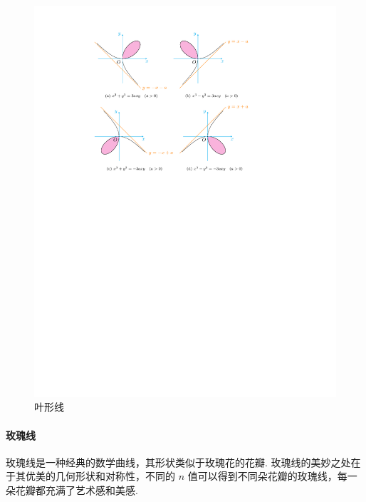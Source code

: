 \begin{figure}[H]
    \centering
    \includegraphics{figures/LeafLinear.pdf}
    \caption{叶形线}
    \label{leafLinear}
\end{figure}

\paragraph{玫瑰线}

玫瑰线是一种经典的数学曲线，其形状类似于玫瑰花的花瓣. 玫瑰线的美妙之处在于其优美的几何形状和对称性，不同的 $n$ 值可以得到不同朵花瓣的玫瑰线，每一朵花瓣都充满了艺术感和美感. 

